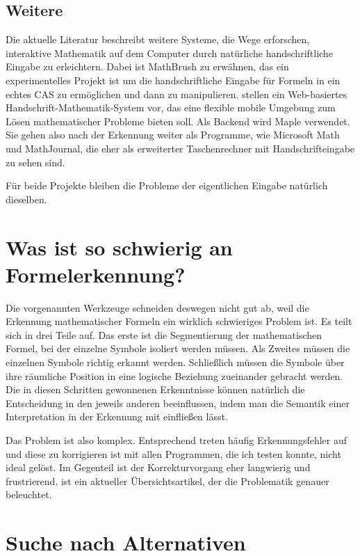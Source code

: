 \subsection{Weitere}
\label{sub:mathbrush}

Die aktuelle Literatur beschreibt weitere Systeme, die Wege erforschen, interaktive Mathematik auf dem Computer durch natürliche handschriftliche Eingabe zu erleichtern. Dabei ist MathBrush \cite{Labahn:2008p10301} zu erwähnen, das ein experimentelles Projekt ist um die handschriftliche Eingabe für Formeln in ein echtes \ac{CAS} zu ermöglichen und dann zu manipulieren. \citet{Vuong:2010p10279} stellen ein Web-basiertes Handschrift-Mathematik-System vor, das eine flexible mobile Umgebung zum Lösen mathematischer Probleme bieten soll. Als Backend wird Maple \cite{maple} verwendet. Sie gehen also nach der Erkennung weiter als Programme, wie Microsoft Math und MathJournal, die eher als erweiterter Taschenrechner mit Handschrifteingabe zu sehen sind.

Für beide Projekte bleiben die Probleme der eigentlichen Eingabe natürlich dieselben.

\section{Was ist so schwierig an Formelerkennung?}

Die vorgenannten Werkzeuge schneiden deswegen nicht gut ab, weil die Erkennung mathematischer Formeln ein wirklich schwieriges Problem ist. Es teilt sich in drei Teile auf. Das erste ist die Segmentierung der mathematischen Formel, bei der einzelne Symbole isoliert werden müssen. Als Zweites müssen die einzelnen Symbole richtig erkannt werden. Schließlich müssen die Symbole über ihre räumliche Position in eine logische Beziehung zueinander gebracht werden. Die in diesen Schritten gewonnenen Erkenntnisse können natürlich die Entscheidung in den jeweils anderen beeinflussen, indem man die Semantik einer Interpretation in der Erkennung mit einfließen lässt.

Das Problem ist also komplex. Entsprechend treten häufig Erkennungsfehler auf und diese zu korrigieren ist mit allen Programmen, die ich testen konnte, nicht ideal gelöst. Im Gegenteil ist der Korrekturvorgang eher langwierig und frustrierend. \cite{Tapia:2007p9160} ist ein aktueller Übersichtsartikel, der die Problematik genauer beleuchtet.

\section{Suche nach Alternativen}
\label{sec:alternativen}

